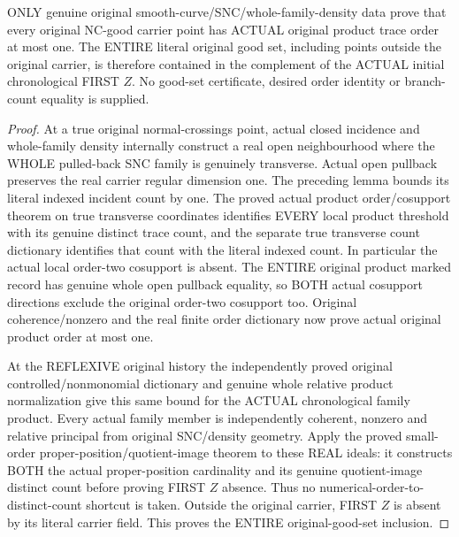 \begin{theorem}
\label{hir:sharp-original-curve-initial-nc-good-first-defect-avoidance}
\leanok
ONLY genuine original smooth-curve/SNC/whole-family-density data prove
that every original NC-good carrier point has ACTUAL original product
trace order at most one. The ENTIRE literal original good set, including
points outside the original carrier, is therefore contained in the
complement of the ACTUAL initial chronological FIRST $Z$. No good-set
certificate, desired order identity or branch-count equality is supplied.
\end{theorem}
\begin{proof}
At a true original normal-crossings point, actual closed incidence and
whole-family density internally construct a real open neighbourhood
where the WHOLE pulled-back SNC family is genuinely transverse. Actual
open pullback preserves the real carrier regular dimension one. The
preceding lemma bounds its literal indexed incident count by one. The
proved actual product order/cosupport theorem on true transverse
coordinates identifies EVERY local product threshold with its genuine
distinct trace count, and the separate true transverse count dictionary
identifies that count with the literal indexed count. In particular the
actual local order-two cosupport is absent. The ENTIRE original product
marked record has genuine whole open pullback equality, so BOTH actual
cosupport directions exclude the original order-two cosupport too.
Original coherence/nonzero and the real finite order dictionary now
prove actual original product order at most one.

At the REFLEXIVE original history the independently proved original
controlled/nonmonomial dictionary and genuine whole relative product
normalization give this same bound for the ACTUAL chronological family
product. Every actual family member is independently coherent, nonzero
and relative principal from original SNC/density geometry. Apply the
proved small-order proper-position/quotient-image theorem to these REAL
ideals: it constructs BOTH the actual proper-position cardinality and
its genuine quotient-image distinct count before proving FIRST $Z$
absence. Thus no numerical-order-to-distinct-count shortcut is taken.
Outside the original carrier, FIRST $Z$ is absent by its literal
carrier field. This proves the ENTIRE original-good-set inclusion.
\end{proof}

